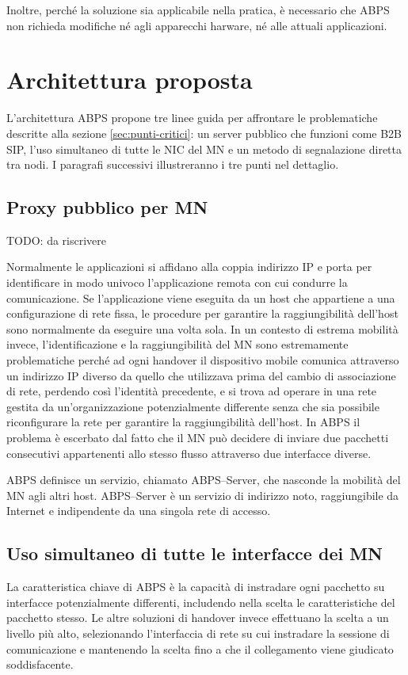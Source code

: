 \documentclass[12pt,a4paper,openright,twoside]{book}
\begin{document}
Inoltre, perché la soluzione sia applicabile nella pratica, è
necessario che ABPS non richieda modifiche né agli apparecchi harware,
né alle attuali applicazioni.

\section {Architettura proposta}
L'architettura ABPS propone tre linee guida per affrontare le
problematiche descritte alla sezione \ref{sec:punti-critici}: un
server pubblico che funzioni come B2B SIP, l'uso simultaneo di tutte
le NIC del MN e un metodo di segnalazione diretta tra nodi. I
paragrafi successivi illustreranno i tre punti nel dettaglio.

\subsection{Proxy pubblico per MN}
TODO: da riscrivere

Normalmente le applicazioni si affidano alla coppia indirizzo IP e
porta per identificare in modo univoco l'applicazione remota con cui
condurre la comunicazione. Se l'applicazione viene eseguita da un host
che appartiene a una configurazione di rete fissa, le procedure per
garantire la raggiungibilità dell'host sono normalmente da eseguire
una volta sola. In un contesto di estrema mobilità invece,
l'identificazione e la raggiungibilità del MN sono estremamente
problematiche perché ad ogni handover il dispositivo mobile comunica
attraverso un indirizzo IP diverso da quello che utilizzava prima del
cambio di associazione di rete, perdendo così l'identità precedente, e
si trova ad operare in una rete gestita da un'organizzazione
potenzialmente differente senza che sia possibile riconfigurare la
rete per garantire la raggiungibilità dell'host. In ABPS il problema è
escerbato dal fatto che il MN può decidere di inviare due pacchetti
consecutivi appartenenti allo stesso flusso attraverso due interfacce
diverse.

ABPS definisce un servizio, chiamato ABPS--Server, che nasconde la
mobilità del MN agli altri host. ABPS--Server è un servizio di
indirizzo noto, raggiungibile da Internet e indipendente da una
singola rete di accesso.

\subsection{Uso simultaneo di tutte le interfacce dei MN}
La caratteristica chiave di ABPS è la capacità di instradare ogni
pacchetto su interfacce potenzialmente differenti, includendo nella
scelta le caratteristiche del pacchetto stesso. Le altre soluzioni di
handover invece effettuano la scelta a un livello più alto,
selezionando l'interfaccia di rete su cui instradare la sessione di
comunicazione e mantenendo la scelta fino a che il collegamento viene
giudicato soddisfacente.
\end{document}
